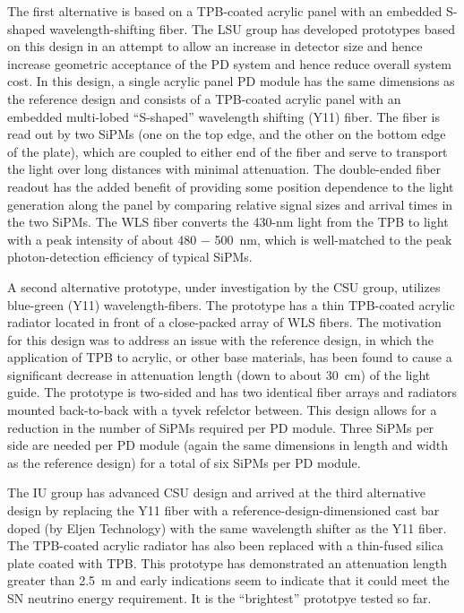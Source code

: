 The first alternative is based on a TPB-coated acrylic panel with an
embedded S-shaped wavelength-shifting fiber. The LSU group has
developed prototypes based on this design in an attempt to allow an
increase in detector size and hence increase geometric acceptance of
the PD system and hence reduce overall system cost.
%
In this design, a single acrylic panel PD module has the same
dimensions as the reference design and consists of a TPB-coated
acrylic panel with an embedded multi-lobed ``S-shaped'' wavelength
shifting (Y11) fiber. The fiber is read out by two SiPMs (one on the
top edge, and the other on the bottom edge of the plate), which are
coupled to either end of the fiber and serve to transport the light
over long distances with minimal attenuation. The double-ended fiber
readout has the added benefit of providing some position dependence to
the light generation along the panel by comparing relative signal
sizes and arrival times in the two SiPMs. The WLS fiber converts the
430-nm light from the TPB to light with a peak intensity of about 480
$-$ 500~nm, which is well-matched to the peak photon-detection
efficiency of typical SiPMs.

A second alternative prototype, under investigation by the CSU group,
utilizes blue-green (Y11) wavelength-fibers. The prototype has a thin
TPB-coated acrylic radiator located in front of a close-packed array
of WLS fibers. The motivation for this design was to address an issue
with the reference design, in which the application of TPB to acrylic,
or other base materials, has been found to cause a significant
decrease in attenuation length (down to about 30~cm) of the light
guide. The prototype is two-sided and has two identical fiber arrays
and radiators mounted back-to-back with a tyvek refelctor
between. This design allows for a reduction in the number of SiPMs
required per PD module. Three SiPMs per side are needed per PD module
(again the same dimensions in length and width as the reference
design) for a total of six SiPMs per PD module.

The IU group has advanced CSU design and arrived at the third
alternative design by replacing the Y11 fiber with a
reference-design-dimensioned cast bar doped (by Eljen Technology) with
the same wavelength shifter as the Y11 fiber. The TPB-coated acrylic
radiator has also been replaced with a thin-fused silica plate coated
with TPB. This prototype has demonstrated an attenuation length
greater than 2.5~m and early indications seem to indicate that it
could meet the SN neutrino energy requirement. It is the ``brightest''
prototpye tested so far.

